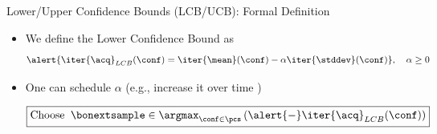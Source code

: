 \begin{frame}[c]{Lower/Upper Confidence Bounds (LCB/UCB): Formal Definition}
\begin{itemize}
    \item We define the \alert{Lower Confidence Bound} as
    \[\alert{\iter{\acq}_{LCB}(\conf) = \iter{\mean}(\conf) - \alpha\iter{\stddev}(\conf)},\quad\alpha\geq0\]

\bigskip
    \item One can schedule $\alpha$ (e.g., increase it over time )

\[
    \boxed{\text{Choose}\;\;\bonextsample \in \argmax_{\conf\in\pcs}\left(\alert{-} \iter{\acq}_{LCB}(\conf)\right)}
\]

\end{itemize}
    \bigskip
    \pause
    
\end{frame}
